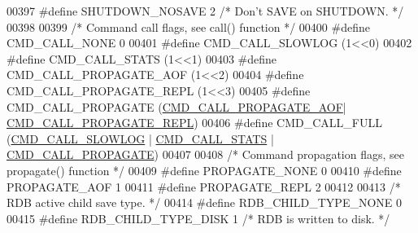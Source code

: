 \begin{DoxyCode}
{{{{{{00397 \textcolor{preprocessor}{#}\textcolor{preprocessor}{define} \textcolor{preprocessor}{SHUTDOWN\_NOSAVE} 2       \textcolor{comment}{/* Don't SAVE on SHUTDOWN. */}
00398 
00399 \textcolor{comment}{/* Command call flags, see call() function */}
00400 \textcolor{preprocessor}{#}\textcolor{preprocessor}{define} \textcolor{preprocessor}{CMD\_CALL\_NONE} 0
00401 \textcolor{preprocessor}{#}\textcolor{preprocessor}{define} \textcolor{preprocessor}{CMD\_CALL\_SLOWLOG} \textcolor{preprocessor}{(}1\textcolor{preprocessor}{<<}0\textcolor{preprocessor}{)}
00402 \textcolor{preprocessor}{#}\textcolor{preprocessor}{define} \textcolor{preprocessor}{CMD\_CALL\_STATS} \textcolor{preprocessor}{(}1\textcolor{preprocessor}{<<}1\textcolor{preprocessor}{)}
00403 \textcolor{preprocessor}{#}\textcolor{preprocessor}{define} \textcolor{preprocessor}{CMD\_CALL\_PROPAGATE\_AOF} \textcolor{preprocessor}{(}1\textcolor{preprocessor}{<<}2\textcolor{preprocessor}{)}
00404 \textcolor{preprocessor}{#}\textcolor{preprocessor}{define} \textcolor{preprocessor}{CMD\_CALL\_PROPAGATE\_REPL} \textcolor{preprocessor}{(}1\textcolor{preprocessor}{<<}3\textcolor{preprocessor}{)}
00405 \textcolor{preprocessor}{#}\textcolor{preprocessor}{define} \textcolor{preprocessor}{CMD\_CALL\_PROPAGATE} \textcolor{preprocessor}{(}\hyperlink{server_8h_a3ca848c94df18641ac372c58fca0e236}{CMD\_CALL\_PROPAGATE\_AOF}\textcolor{preprocessor}{|}
      \hyperlink{server_8h_a69e4a8fdb26588e1028deb20fd51424a}{CMD\_CALL\_PROPAGATE\_REPL}\textcolor{preprocessor}{)}
00406 \textcolor{preprocessor}{#}\textcolor{preprocessor}{define} \textcolor{preprocessor}{CMD\_CALL\_FULL} \textcolor{preprocessor}{(}\hyperlink{server_8h_a934cea7b13db05a29264146cd5b14064}{CMD\_CALL\_SLOWLOG} \textcolor{preprocessor}{|} \hyperlink{server_8h_a7b1d9cf5be21e4808da0c16f03155973}{CMD\_CALL\_STATS} \textcolor{preprocessor}{|} 
      \hyperlink{server_8h_a6ee9ed603f975d0d2b6ae44f1907565f}{CMD\_CALL\_PROPAGATE}\textcolor{preprocessor}{)}
00407 
00408 \textcolor{comment}{/* Command propagation flags, see propagate() function */}
00409 \textcolor{preprocessor}{#}\textcolor{preprocessor}{define} \textcolor{preprocessor}{PROPAGATE\_NONE} 0
00410 \textcolor{preprocessor}{#}\textcolor{preprocessor}{define} \textcolor{preprocessor}{PROPAGATE\_AOF} 1
00411 \textcolor{preprocessor}{#}\textcolor{preprocessor}{define} \textcolor{preprocessor}{PROPAGATE\_REPL} 2
00412 
00413 \textcolor{comment}{/* RDB active child save type. */}
00414 \textcolor{preprocessor}{#}\textcolor{preprocessor}{define} \textcolor{preprocessor}{RDB\_CHILD\_TYPE\_NONE} 0
00415 \textcolor{preprocessor}{#}\textcolor{preprocessor}{define} \textcolor{preprocessor}{RDB\_CHILD\_TYPE\_DISK} 1     \textcolor{comment}{/* RDB is written to disk. */}
}}}}}}
\end{DoxyCode}

